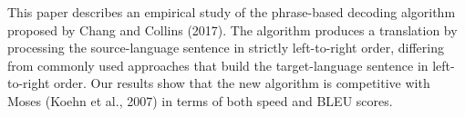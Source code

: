 This paper describes an empirical study of the phrase-based decoding algorithm proposed by Chang and Collins (2017).  The algorithm produces a translation by processing the source-language sentence in strictly left-to-right order, differing from commonly used approaches that build the target-language sentence in left-to-right order. Our results show that the new algorithm is competitive with Moses (Koehn et al., 2007) in terms of both speed and BLEU scores.
